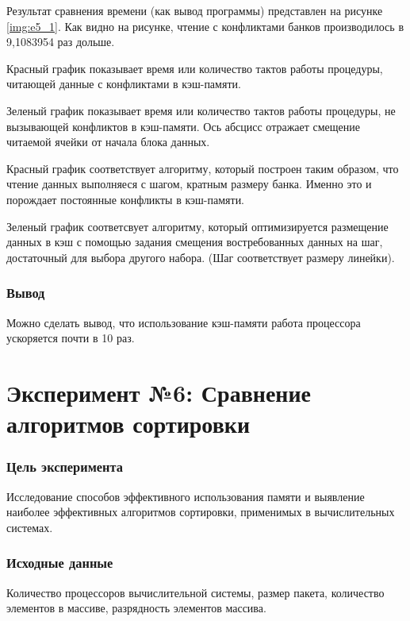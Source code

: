 
Результат сравнения времени (как вывод программы) представлен на рисунке \ref{img:e5_1}. Как видно на рисунке, чтение с конфликтами банков производилось в 9,1083954 раз дольше.

\newpage

Красный график показывает время или количество тактов работы процедуры, читающей данные с конфликтами в кэш-памяти. 

Зеленый график показывает время или количество тактов работы процедуры, не вызывающей конфликтов в кэш-памяти. Ось абсцисс отражает смещение читаемой ячейки от начала блока данных.

Красный график соответствует алгоритму, который построен таким образом, что чтение данных выполняеся с шагом, кратным размеру банка. Именно это и порождает постоянные конфликты в кэш-памяти.

Зеленый график соответсвует алгоритму, который оптимизируется размещение данных в кэш с помощью задания смещения востребованных данных на шаг, достаточный для выбора другого набора. (Шаг соответствует размеру линейки).

\subsection*{Вывод}
Можно сделать вывод, что использование кэш-памяти работа процессора ускоряется почти в 10 раз.


\chapter*{Эксперимент №6: Сравнение алгоритмов сортировки}

\subsection*{Цель эксперимента}
Исследование способов эффективного использования памяти и выявление наиболее эффективных алгоритмов сортировки, применимых в вычислительных системах. 

\subsection*{Исходные данные}
Количество процессоров вычислительной системы, размер пакета, количество элементов в массиве, разрядность элементов массива.

